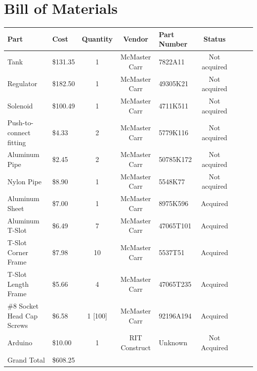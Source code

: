 \documentclass[conference]{IEEEtran} %
\begin{document}
\newpage
\section{\textbf{Bill of Materials}}
\begin{table}[ht]
  \centering
  \begin{tabularx}{\columnwidth}{@{}lXc@{}cXc@{}cXc@{}} \toprule

    Part & Cost & Quantity & Vendor & Part Number & Status \\ \midrule

    Tank & \$131.35 & 1 & McMaster Carr & 7822A11 & Not acquired \\
    Regulator & \$182.50 & 1 & McMaster Carr & 49305K21 & Not acquired \\
    Solenoid & \$100.49 & 1 & McMaster Carr & 4711K511 & Not acquired \\
    Push-to-connect fitting & \$4.33 & 2 & McMaster Carr & 5779K116 & Not acquired \\
    Aluminum Pipe & \$2.45 & 2 & McMaster Carr & 50785K172 & Not acquired \\
    Nylon Pipe & \$8.90 & 1 & McMaster Carr & 5548K77 & Not acquired \\
    Aluminum Sheet & \$7.00 & 1 & McMaster Carr & 8975K596 & Acquired \\
    Aluminum T-Slot & \$6.49 & 7 & McMaster Carr & 47065T101 & Acquired \\
    T-Slot Corner Frame & \$7.98 & 10 & McMaster Carr & 5537T51 & Acquired \\
    T-Slot Length Frame & \$5.66 & 4 & McMaster Carr & 47065T235 & Acquired \\
    \#8 Socket Head Cap Screws & \$6.58 & 1 [100] & McMaster Carr & 92196A194 & Acquired \\
    Arduino & \$10.00 & 1 & RIT Construct & Unknown & Not Acquired \\
    \midrule
    Grand Total & \$608.25 &&&& \\
    \bottomrule
  \end{tabularx}
\label{tab:CGT-part-list}
\end{table}
\end{document}
